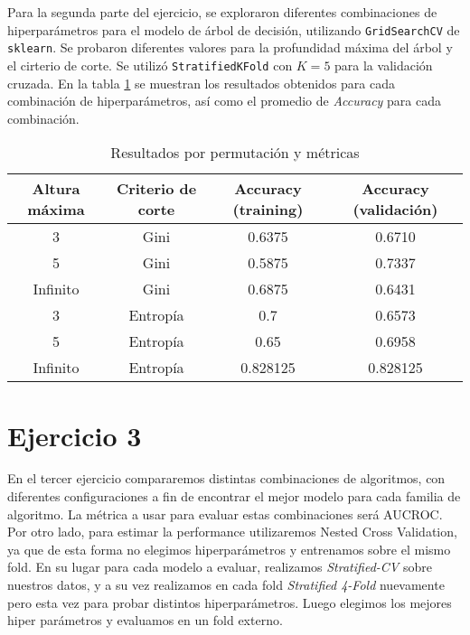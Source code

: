 \documentclass[12pt,a4paper]{article}
\begin{document}
Para la segunda parte del ejercicio, se exploraron diferentes combinaciones de hiperparámetros para el modelo de árbol de decisión, utilizando \texttt{GridSearchCV} de \texttt{sklearn}.
 Se probaron diferentes valores para la profundidad máxima del árbol y el cirterio de corte. Se utilizó \texttt{StratifiedKFold} con $K=5$ para la validación cruzada.
En la tabla \ref{tab:resultados-arbol-gridsearch-1} se muestran los resultados obtenidos para cada combinación de hiperparámetros, así como el promedio de \textit{Accuracy} para cada combinación.
 \begin{table}[H]
    \centering
    \begin{tabular}{|c|c|c|c|}
    \hline
    \textbf{Altura máxima} & \textbf{Criterio de corte} &\textbf{Accuracy} (training) &\textbf{Accuracy} (validación)  \\
    \hline
    3 & Gini   & 0.6375 & 0.6710  \\
    \hline
    5 & Gini & 0.5875 & 0.7337  \\
    \hline
    Infinito & Gini    & 0.6875 & 0.6431 \\
    \hline
    3 & Entropía & 0.7    & 0.6573  \\
    \hline
    5 & Entropía  & 0.65   & 0.6958  \\
    \hline  
    Infinito &  Entropía &  0.828125 &  0.828125 \\
    \hline
    \end{tabular}
    \caption{Resultados por permutación y métricas}
    \label{tab:resultados-arbol-gridsearch-1}
\end{table}

\section{Ejercicio 3}
\par En el tercer ejercicio compararemos distintas combinaciones de algoritmos, con diferentes configuraciones a fin de encontrar el mejor modelo para cada familia de algoritmo. La métrica a usar para evaluar estas combinaciones será AUCROC. Por otro lado, para estimar la performance utilizaremos Nested Cross Validation, ya que de esta forma no elegimos hiperparámetros y entrenamos sobre el mismo fold. En su lugar para cada modelo a evaluar, realizamos \textit{Stratified-CV} sobre nuestros datos, y a su vez realizamos en cada fold \textit{Stratified 4-Fold} nuevamente pero esta vez para probar distintos hiperparámetros. Luego elegimos los mejores hiper parámetros y evaluamos en un fold externo.
\end{document}
